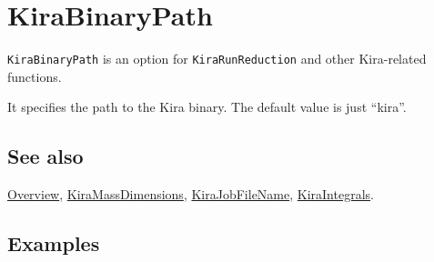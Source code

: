 \documentclass[../FeynHelpersManual.tex]{subfiles}
\begin{document}
\begin{Shaded}
\begin{Highlighting}[]
 
\end{Highlighting}
\end{Shaded}

\hypertarget{kirabinarypath}{
\section{KiraBinaryPath}\label{kirabinarypath}}

\texttt{KiraBinaryPath} is an option for \texttt{KiraRunReduction} and
other Kira-related functions.

It specifies the path to the Kira binary. The default value is just
``kira''.

\subsection{See also}

\hyperlink{toc}{Overview},
\hyperlink{kiramassdimensions}{KiraMassDimensions},
\hyperlink{kirajobfilename}{KiraJobFileName},
\hyperlink{kiraintegrals}{KiraIntegrals}.

\subsection{Examples}
\end{document}
